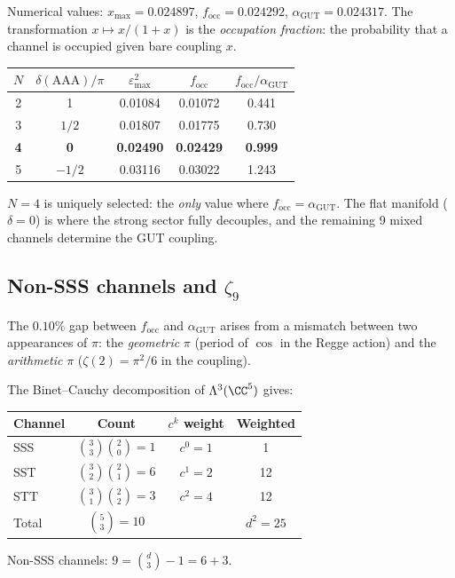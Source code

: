 Numerical values: $x_{\max} = 0.024897$, $f_{\mathrm{occ}} = 0.024292$, $\alpha_\text{GUT} = 0.024317$.  The transformation $x \mapsto x/(1+x)$ is the \emph{occupation fraction}: the probability that a channel is occupied given bare coupling $x$.

\begin{center}
\begin{tabular}{ccccc}
\hline
$N$ & $\delta(\mathrm{AAA})/\pi$ & $\varepsilon_{\max}^2$ & $f_{\mathrm{occ}}$ & $f_{\mathrm{occ}}/\alpha_\text{GUT}$ \\
\hline
2 & 1 & 0.01084 & 0.01072 & 0.441 \\
3 & $1/2$ & 0.01807 & 0.01775 & 0.730 \\
\textbf{4} & \textbf{0} & \textbf{0.02490} & \textbf{0.02429} & \textbf{0.999} \\
5 & $-1/2$ & 0.03116 & 0.03022 & 1.243 \\
\hline
\end{tabular}
\end{center}

$N=4$ is uniquely selected: the \emph{only} value where $f_\mathrm{occ} = \alpha_\text{GUT}$.  The flat manifold ($\delta = 0$) is where the strong sector fully decouples, and the remaining 9 mixed channels determine the GUT coupling.

\subsection{Non-SSS channels and $\zeta_9$}
\label{sec:zeta9}

The $0.10\%$ gap between $f_\mathrm{occ}$ and $\alpha_\text{GUT}$ arises from a mismatch between two appearances of $\pi$: the \emph{geometric} $\pi$ (period of $\cos$ in the Regge action) and the \emph{arithmetic} $\pi$ ($\zeta(2) = \pi^2/6$ in the coupling).

\begin{theorem}
\label{thm:channel_count}
The Binet--Cauchy decomposition of $\Lambda^3(\CC^5)$ gives:
\begin{center}
\begin{tabular}{lccc}
\hline
Channel & Count & $c^k$ weight & Weighted \\
\hline
SSS & $\binom{3}{3}\binom{2}{0} = 1$ & $c^0 = 1$ & 1 \\
SST & $\binom{3}{2}\binom{2}{1} = 6$ & $c^1 = 2$ & 12 \\
STT & $\binom{3}{1}\binom{2}{2} = 3$ & $c^2 = 4$ & 12 \\
\hline
Total & $\binom{5}{3} = 10$ & & $d^2 = 25$ \\
\hline
\end{tabular}
\end{center}
Non-SSS channels: $9 = \binom{d}{3} - 1 = 6 + 3$.
\end{theorem}

